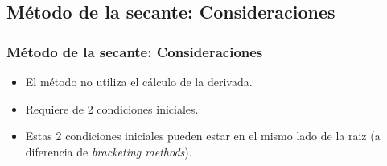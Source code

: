 \documentclass[xcolor=svgnames]{beamer} %
\theoremstyle{plain}
\theoremstyle{definition}
\begin{document}
\subsection{Método de la secante: Consideraciones}

\begin{frame}
\frametitle{Método de la secante: Consideraciones}

\begin{itemize}
\item El método no utiliza el cálculo de la derivada.
\item Requiere de 2 condiciones iniciales.
\item Estas 2 condiciones iniciales pueden estar en el mismo lado de la raiz (a diferencia de \textit{bracketing methods}).
\end{itemize}

\end{frame}
\end{document}
